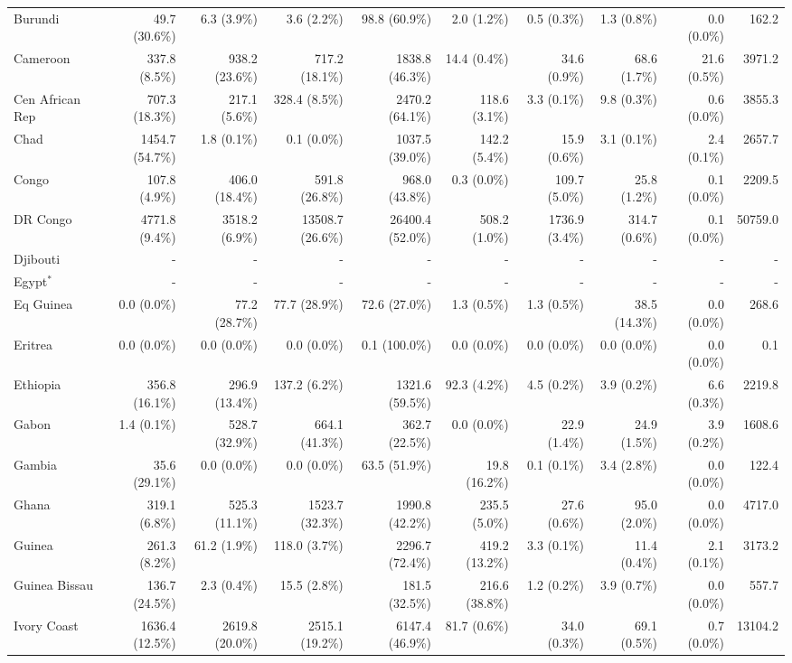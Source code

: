 \begin{scriptsize}
\begin{landscape}
\begin{center}
\begin{longtable}[ht]{lrrrrrrrrr}
			Burundi&49.7 (30.6\%)&6.3 (3.9\%)&3.6 (2.2\%)&98.8 (60.9\%)&2.0 (1.2\%)&0.5 (0.3\%)&1.3 (0.8\%)&0.0 (0.0\%)&162.2\\
			Cameroon&337.8 (8.5\%)&938.2 (23.6\%)&717.2 (18.1\%)&1838.8 (46.3\%)&14.4 (0.4\%)&34.6 (0.9\%)&68.6 (1.7\%)&21.6 (0.5\%)&3971.2\\
			Cen African Rep&707.3 (18.3\%)&217.1 (5.6\%)&328.4 (8.5\%)&2470.2 (64.1\%)&118.6 (3.1\%)&3.3 (0.1\%)&9.8 (0.3\%)&0.6 (0.0\%)&3855.3\\
			Chad&1454.7 (54.7\%)&1.8 (0.1\%)&0.1 (0.0\%)&1037.5 (39.0\%)&142.2 (5.4\%)&15.9 (0.6\%)&3.1 (0.1\%)&2.4 (0.1\%)&2657.7\\
			Congo&107.8 (4.9\%)&406.0 (18.4\%)&591.8 (26.8\%)&968.0 (43.8\%)&0.3 (0.0\%)&109.7 (5.0\%)&25.8 (1.2\%)&0.1 (0.0\%)&2209.5\\
			DR Congo&4771.8 (9.4\%)&3518.2 (6.9\%)&13508.7 (26.6\%)&26400.4 (52.0\%)&508.2 (1.0\%)&1736.9 (3.4\%)&314.7 (0.6\%)&0.1 (0.0\%)&50759.0\\
			Djibouti&-&-&-&-&-&-&-&-&-\\
			Egypt$^*$&-&-&-&-&-&-&-&-&-\\
			Eq Guinea&0.0 (0.0\%)&77.2 (28.7\%)&77.7 (28.9\%)&72.6 (27.0\%)&1.3 (0.5\%)&1.3 (0.5\%)&38.5 (14.3\%)&0.0 (0.0\%)&268.6\\
			Eritrea&0.0 (0.0\%)&0.0 (0.0\%)&0.0 (0.0\%)&0.1 (100.0\%)&0.0 (0.0\%)&0.0 (0.0\%)&0.0 (0.0\%)&0.0 (0.0\%)&0.1\\
			Ethiopia&356.8 (16.1\%)&296.9 (13.4\%)&137.2 (6.2\%)&1321.6 (59.5\%)&92.3 (4.2\%)&4.5 (0.2\%)&3.9 (0.2\%)&6.6 (0.3\%)&2219.8\\
			Gabon&1.4 (0.1\%)&528.7 (32.9\%)&664.1 (41.3\%)&362.7 (22.5\%)&0.0 (0.0\%)&22.9 (1.4\%)&24.9 (1.5\%)&3.9 (0.2\%)&1608.6\\
			Gambia&35.6 (29.1\%)&0.0 (0.0\%)&0.0 (0.0\%)&63.5 (51.9\%)&19.8 (16.2\%)&0.1 (0.1\%)&3.4 (2.8\%)&0.0 (0.0\%)&122.4\\
			Ghana&319.1 (6.8\%)&525.3 (11.1\%)&1523.7 (32.3\%)&1990.8 (42.2\%)&235.5 (5.0\%)&27.6 (0.6\%)&95.0 (2.0\%)&0.0 (0.0\%)&4717.0\\
			Guinea&261.3 (8.2\%)&61.2 (1.9\%)&118.0 (3.7\%)&2296.7 (72.4\%)&419.2 (13.2\%)&3.3 (0.1\%)&11.4 (0.4\%)&2.1 (0.1\%)&3173.2\\
			Guinea Bissau&136.7 (24.5\%)&2.3 (0.4\%)&15.5 (2.8\%)&181.5 (32.5\%)&216.6 (38.8\%)&1.2 (0.2\%)&3.9 (0.7\%)&0.0 (0.0\%)&557.7\\
			Ivory Coast&1636.4 (12.5\%)&2619.8 (20.0\%)&2515.1 (19.2\%)&6147.4 (46.9\%)&81.7 (0.6\%)&34.0 (0.3\%)&69.1 (0.5\%)&0.7 (0.0\%)&13104.2\\

\end{longtable}
\end{center}
\end{landscape}
\end{scriptsize}
